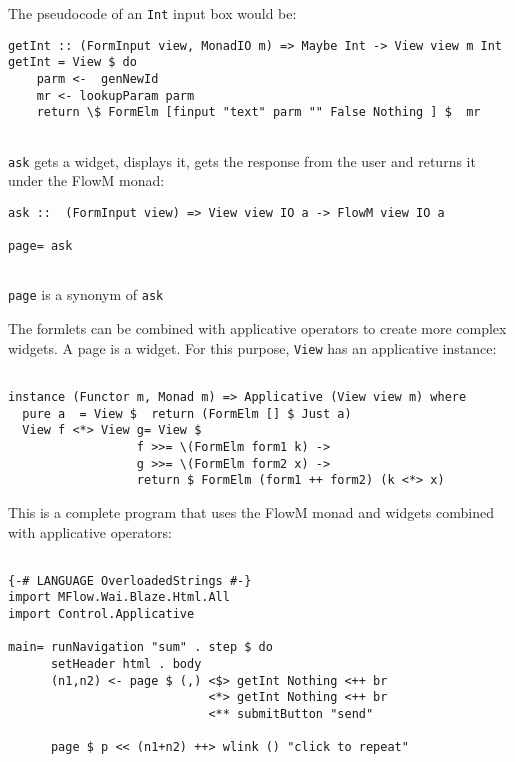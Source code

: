 \documentclass{tmr}
\begin{document}
The pseudocode of an {\tt Int} input box would be: 
 
{\tt 
 
\begin{verbatim} 
getInt :: (FormInput view, MonadIO m) => Maybe Int -> View view m Int 
getInt = View $ do 
    parm <-  genNewId 
    mr <- lookupParam parm 
    return \$ FormElm [finput "text" parm "" False Nothing ] $  mr 
 
\end{verbatim} 
 
} 
 
{\tt ask} gets a  widget, displays it, gets the response from the user and returns it under the FlowM monad: 
 
{\tt 
 
\begin{verbatim} 
ask ::  (FormInput view) => View view IO a -> FlowM view IO a 
 
page= ask 
 
\end{verbatim} 
 
} 
{\tt page} is a synonym of {\tt ask} 
 
The formlets can be combined with applicative operators to create more complex widgets. A page is a widget. For this purpose, {\tt View} has an applicative instance: 
 
{\tt 
 
\begin{verbatim} 
 
instance (Functor m, Monad m) => Applicative (View view m) where 
  pure a  = View $  return (FormElm [] $ Just a) 
  View f <*> View g= View $ 
                  f >>= \(FormElm form1 k) -> 
                  g >>= \(FormElm form2 x) -> 
                  return $ FormElm (form1 ++ form2) (k <*> x)
\end{verbatim} 
 
} 
 
This is a complete program that uses the FlowM monad and widgets 
combined with applicative operators: 
 
 
 
{\tt 
 
\begin{verbatim} 
 
{-# LANGUAGE OverloadedStrings #-} 
import MFlow.Wai.Blaze.Html.All 
import Control.Applicative 
 
main= runNavigation "sum" . step $ do 
      setHeader html . body 
      (n1,n2) <- page $ (,) <$> getInt Nothing <++ br 
                            <*> getInt Nothing <++ br 
                            <** submitButton "send" 
 
      page $ p << (n1+n2) ++> wlink () "click to repeat" 
\end{verbatim} 
 
} 
 
\end{document}
